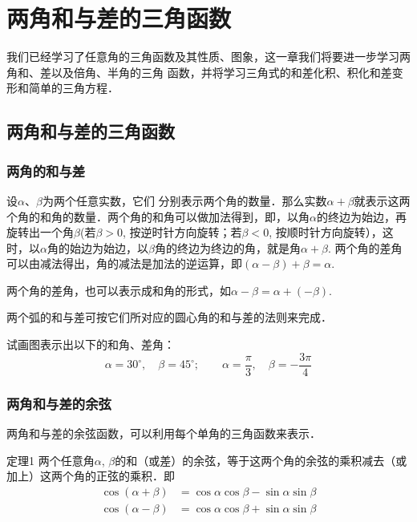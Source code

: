 \chapter{两角和与差的三角函数}
我们已经学习了任意角的三角函数及其性质、图象，这一章我们将要进一步学习两角和、差以及倍角、半角的三角
函数，并将学习三角式的和差化积、积化和差变形和简单的三角方程．
\section{两角和与差的三角函数}
\subsection{两角的和与差}
设$\alpha$、$\beta$为两个任意实数，它们
分别表示两个角的数量．那么实数$\alpha+\beta$就表示这两个角的和角的数量．两个角的和角可以做加法得到，即，以角$\alpha $的终边为始边，再旋转出一个角$\beta$(若$\beta>0$, 按逆时针方向旋转；若$\beta<0$, 按顺时针方向旋转），这时，以$\alpha $角的始边为始边，以$\beta$角的终边为终边的角，就是角$\alpha +\beta$. 两个角的差角可以由减法得出，角的减法是加法的逆运算，即$(\alpha -\beta)+\beta=\alpha$.

两个角的差角，也可以表示成和角的形式，如$\alpha -\beta=\alpha + (-\beta)$.

两个弧的和与差可按它们所对应的圆心角的和与差的法则来完成．

\begin{ex}
    试画图表示出以下的和角、差角：
    \[\alpha=30^{\circ},\quad \beta=45^{\circ}; \qquad \alpha=\frac{\pi}{3},\quad \beta=-\frac{3\pi}{4}   \]
\end{ex}

\subsection{两角和与差的余弦}
两角和与差的余弦函数，可以利用每个单角的三角函数来表示．

\begin{blk}{定理1}
    两个任意角$\alpha$, $\beta$的和（或差）的余弦，等于这两个角的余弦的乘积减去（或加上）这两个角的正弦的乘积．即
\begin{align}
    \cos (\alpha+\beta) &=\cos\alpha\cos\beta-\sin\alpha\sin\beta\\
\cos (\alpha-\beta) &=\cos\alpha\cos\beta+\sin\alpha\sin\beta
\end{align}
\end{blk}
 
